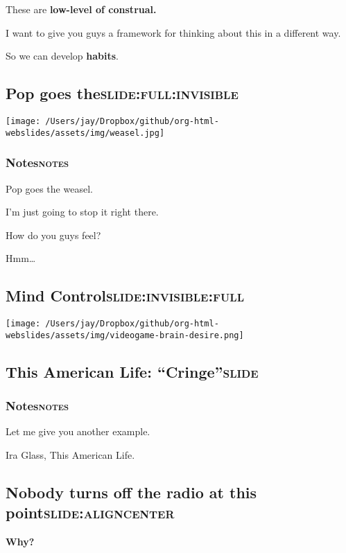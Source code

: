 \documentclass[12pt]{article}
\begin{document}
These are \textbf{low-level of construal.}

I want to give you guys a framework for thinking about this in a different way.

So we can develop \textbf{habits}.

\subsection[Pop goes the]{Pop goes the\hfill{}\textsc{slide:full:invisible}}
\label{sec:org2f544e3}
\begin{center}
\texttt{[image: /Users/jay/Dropbox/github/org-html-webslides/assets/img/weasel.jpg]}
\end{center}

\subsubsection[Notes]{Notes\hfill{}\textsc{notes}}
\label{sec:orgd3119d1}
Pop goes the weasel.

I'm just going to stop it right there.

How do you guys feel?

Hmm\ldots{}

\subsection[Mind Control]{Mind Control\hfill{}\textsc{slide:invisible:full}}
\label{sec:org16d0d61}
\begin{center}
\texttt{[image: /Users/jay/Dropbox/github/org-html-webslides/assets/img/videogame-brain-desire.png]}
\end{center}


\subsection[This American Life: ``Cringe'']{This American Life: ``Cringe''\hfill{}\textsc{slide}}
\label{sec:orga762e5c}


\subsubsection[Notes]{Notes\hfill{}\textsc{notes}}
\label{sec:org4ca344e}
Let me give you another example.

Ira Glass, This American Life.
\subsection[\textbf{Nobody} turns off the radio at this point]{\textbf{Nobody} turns off the radio at this point\hfill{}\textsc{slide:aligncenter}}
\label{sec:org5f6afcf}
\textbf{Why?}
\end{document}
